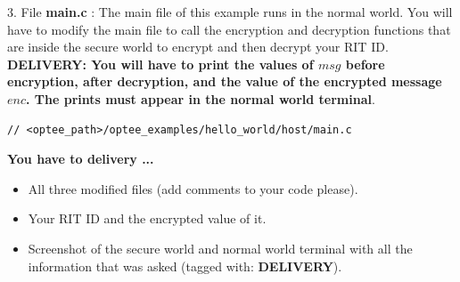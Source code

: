 \documentclass[10pt]{article}
\begin{document}
\begin{enumerate}
3. File \textbf{main.c} : The main file of this example runs in the normal world. You will have to modify the main file to call the encryption and decryption functions that are inside the secure world to encrypt and then decrypt your RIT ID.  \textbf{DELIVERY: You will have to print the values of $msg$ before encryption, after decryption, and the value of the encrypted message $enc$. The prints must appear in the normal world terminal}.

\begin{lstlisting}
// <optee_path>/optee_examples/hello_world/host/main.c
\end{lstlisting}


\newpage
\textbf{You have to delivery ...}

\begin{itemize}
	\item All three modified files (add comments to your code please).
	\item Your RIT ID and the encrypted value of it.
	\item Screenshot of the secure world and normal world terminal with all the information that was asked (tagged with: \textbf{DELIVERY}).
\end{itemize}


\end{enumerate}
\end{document}
